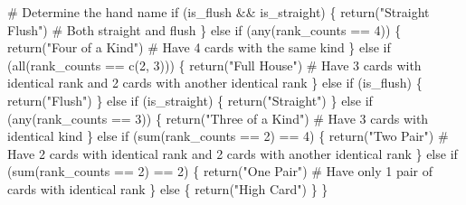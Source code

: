 \documentclass[
  letterpaper,
  DIV=11,
  numbers=noendperiod]{scrartcl}
\newenvironment{Shaded}{\begin{snugshade}}{\end{snugshade}}
\newcommand{\CommentTok}[1]{\textcolor[rgb]{0.37,0.37,0.37}{#1}}
\newcommand{\ControlFlowTok}[1]{\textcolor[rgb]{0.00,0.23,0.31}{#1}}
\newcommand{\DecValTok}[1]{\textcolor[rgb]{0.68,0.00,0.00}{#1}}
\newcommand{\FunctionTok}[1]{\textcolor[rgb]{0.28,0.35,0.67}{#1}}
\newcommand{\NormalTok}[1]{\textcolor[rgb]{0.00,0.23,0.31}{#1}}
\newcommand{\SpecialCharTok}[1]{\textcolor[rgb]{0.37,0.37,0.37}{#1}}
\newcommand{\StringTok}[1]{\textcolor[rgb]{0.13,0.47,0.30}{#1}}
\begin{document}
\begin{Shaded}
\begin{Highlighting}[]
  \CommentTok{\# Determine the hand name}
  \ControlFlowTok{if}\NormalTok{ (is\_flush }\SpecialCharTok{\&\&}\NormalTok{ is\_straight) \{}
    \FunctionTok{return}\NormalTok{(}\StringTok{"Straight Flush"}\NormalTok{)  }\CommentTok{\# Both straight and flush}
\NormalTok{  \} }\ControlFlowTok{else} \ControlFlowTok{if}\NormalTok{ (}\FunctionTok{any}\NormalTok{(rank\_counts }\SpecialCharTok{==} \DecValTok{4}\NormalTok{)) \{}
    \FunctionTok{return}\NormalTok{(}\StringTok{"Four of a Kind"}\NormalTok{)  }\CommentTok{\# Have 4 cards with the same kind}
\NormalTok{  \} }\ControlFlowTok{else} \ControlFlowTok{if}\NormalTok{ (}\FunctionTok{all}\NormalTok{(rank\_counts }\SpecialCharTok{==} \FunctionTok{c}\NormalTok{(}\DecValTok{2}\NormalTok{, }\DecValTok{3}\NormalTok{))) \{}
    \FunctionTok{return}\NormalTok{(}\StringTok{"Full House"}\NormalTok{)  }\CommentTok{\# Have 3 cards with identical rank and 2 cards with another identical rank}
\NormalTok{  \} }\ControlFlowTok{else} \ControlFlowTok{if}\NormalTok{ (is\_flush) \{}
    \FunctionTok{return}\NormalTok{(}\StringTok{"Flush"}\NormalTok{)}
\NormalTok{  \} }\ControlFlowTok{else} \ControlFlowTok{if}\NormalTok{ (is\_straight) \{}
    \FunctionTok{return}\NormalTok{(}\StringTok{"Straight"}\NormalTok{)  }
\NormalTok{  \} }\ControlFlowTok{else} \ControlFlowTok{if}\NormalTok{ (}\FunctionTok{any}\NormalTok{(rank\_counts }\SpecialCharTok{==} \DecValTok{3}\NormalTok{)) \{}
    \FunctionTok{return}\NormalTok{(}\StringTok{"Three of a Kind"}\NormalTok{)  }\CommentTok{\# Have 3 cards with identical kind}
\NormalTok{  \} }\ControlFlowTok{else} \ControlFlowTok{if}\NormalTok{ (}\FunctionTok{sum}\NormalTok{(rank\_counts }\SpecialCharTok{==} \DecValTok{2}\NormalTok{) }\SpecialCharTok{==} \DecValTok{4}\NormalTok{) \{}
    \FunctionTok{return}\NormalTok{(}\StringTok{"Two Pair"}\NormalTok{)  }\CommentTok{\# Have 2 cards with identical rank and 2 cards with another identical rank}
\NormalTok{  \} }\ControlFlowTok{else} \ControlFlowTok{if}\NormalTok{ (}\FunctionTok{sum}\NormalTok{(rank\_counts }\SpecialCharTok{==} \DecValTok{2}\NormalTok{) }\SpecialCharTok{==} \DecValTok{2}\NormalTok{) \{}
    \FunctionTok{return}\NormalTok{(}\StringTok{"One Pair"}\NormalTok{)  }\CommentTok{\# Have only 1 pair of cards with identical rank}
\NormalTok{  \} }\ControlFlowTok{else}\NormalTok{ \{}
    \FunctionTok{return}\NormalTok{(}\StringTok{"High Card"}\NormalTok{)}
\NormalTok{  \}}
\NormalTok{\}}


\end{Highlighting}
\end{Shaded}
\end{document}

